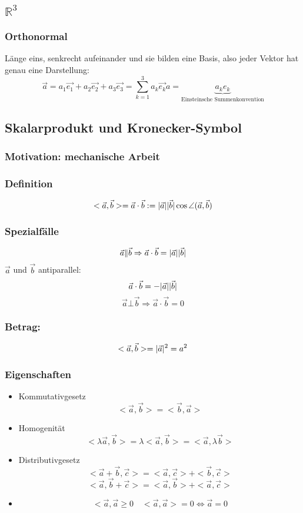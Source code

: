 \documentclass[11pt]{article}
\DeclarePairedDelimiter\abs{\lvert}{\rvert}%
\begin{document}
\subsection{$\mathbb{R}^3$}
\label{sec-12-1}
\subsubsection{Orthonormal}
\label{sec-12-1-1}
Länge eins, senkrecht aufeinander und sie bilden eine Basis, also jeder Vektor hat genau eine Darstellung: \[\vec{a} = a_1 \vec{e_1} + a_2 \vec{e_2} + a_3 \vec{e_3} = \sum_{k=1}^3 a_k \vec{e_k}a = \underbrace{a_k e_k}_{\text{Einsteinsche Summenkonvention}}\]
\subsection{Skalarprodukt und Kronecker-Symbol}
\label{sec-12-2}
\subsubsection{Motivation: mechanische Arbeit}
\label{sec-12-2-1}
\subsubsection{Definition}
\label{sec-12-2-2}
\[<\vec{a},\vec{b}> = \vec{a}\cdot\vec{b} := \abs{\vec{a}}\abs{\vec{b}}\cos{\angle (\vec{a},\vec{b})}\]
\subsubsection{Spezialfälle}
\label{sec-12-2-3}
\[\vec{a}\|\vec{b}\Rightarrow \vec{a}\cdot\vec{b}=\abs{\vec{a}}\abs{\vec{b}}\]
$\vec{a}$ und $\vec{b}$ antiparallel:
\[\vec{a}\cdot\vec{b}=-\abs{\vec{a}}\abs{\vec{b}}\]
\[\vec{a}\bot\vec{b}\Rightarrow\vec{a}\cdot\vec{b}=0\]
\subsubsection{Betrag:}
\label{sec-12-2-4}
\[<\vec{a},\vec{b}>=\abs{\vec{a}}^2=a^2\]
\subsubsection{Eigenschaften}
\label{sec-12-2-5}
\begin{itemize}
\item Kommutativgesetz
\[<\vec{a},\vec{b}>=<\vec{b},\vec{a}>\]
\item Homogenität
\[<\lambda\vec{a},\vec{b}>=\lambda<\vec{a},\vec{b}>=<\vec{a},\lambda\vec{b}>\]
\item Distributivgesetz
\[<\vec{a}+\vec{b},\vec{c}>=<\vec{a},\vec{c}>+<\vec{b},\vec{c}>\]
\[<\vec{a},\vec{b}+\vec{c}>=<\vec{a},\vec{b}>+<\vec{a},\vec{c}>\]
\item \[<\vec{a},\vec{a}\geq 0 \quad <\vec{a},\vec{a}>=0\Leftrightarrow\vec{a}=0\]
\end{itemize}
\end{document}
